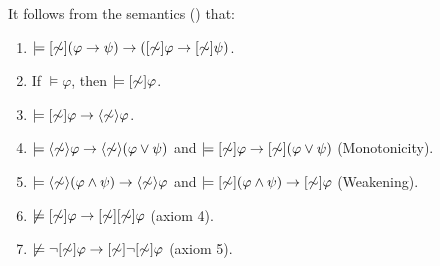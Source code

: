 \begin{proposition}\label{prop:aref-normal-serial}
It follows from the semantics () that:
\begin{enumerate}
\item $\models [\not\sim](\varphi \rightarrow \psi) \rightarrow ([\not\sim]\varphi \rightarrow
[\not\sim]\psi)$.
\item If $\models \varphi$, then $\models [\not\sim]\varphi$.
\item $\models [\not\sim]\varphi \rightarrow \langle \not\sim \rangle\varphi$.


\item $\models \langle \not\sim \rangle \varphi \rightarrow \langle \not\sim \rangle (\varphi \vee \psi)$ and $\models [\not\sim] \varphi \rightarrow [\not\sim] (\varphi \vee \psi)$ (Monotonicity).
\item $\models \langle \not\sim \rangle (\varphi \wedge \psi) \rightarrow \langle \not\sim \rangle \varphi$ and $\models [\not\sim] (\varphi \wedge \psi) \rightarrow [\not\sim] \varphi$ (Weakening).
\item $\not\models [\not\sim] \varphi \rightarrow [\not\sim][\not\sim] \varphi$ (axiom 4). %
\item $\not\models \neg[\not\sim] \varphi \rightarrow [\not\sim]\neg[\not\sim] \varphi$ (axiom 5). %
\end{enumerate}
\end{proposition}

